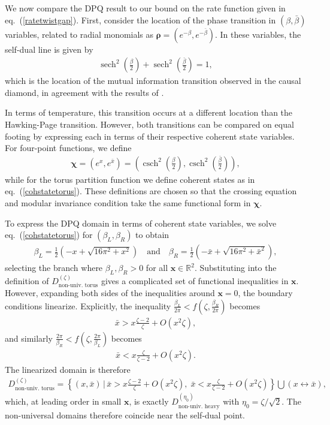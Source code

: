 \documentclass[a4paper,11pt]{article}
\theoremstyle{plain}
\theoremstyle{definition}
\theoremstyle{remark}
\newcommand{\bs}[1]{\boldsymbol{#1}}
\newcommand{\ba}{\begin{equation} \begin{aligned}}
\newcommand{\ea}{\end{aligned} \end{equation}}
\DeclareMathOperator{\sech}{sech}
\DeclareMathOperator{\csch}{csch}
\begin{document}
We now compare the DPQ result to our bound on the rate function given in eq.~(\ref{ratetwistgap}). First, consider the location of the phase transition in $(\beta,\bar{\beta})$ variables, related to radial monomials as $\bs{\rho} = (e^{-\beta}, e^{-\bar{\beta}})$. In these variables, the self-dual line is given by
\ba
\sech^2\left(\frac{\beta}{2}\right) + \sech^2\left(\frac{\bar{\beta}}{2}\right) = 1,
\ea
which is the location of the mutual information transition observed in the causal diamond, in agreement with the results of \cite{Ceyhan:2025qrj}. 

In terms of temperature, this transition occurs at a different location than the Hawking-Page transition. However, both transitions can be compared on equal footing by expressing each in terms of their respective coherent state variables. For four-point functions, we define
\ba
\bs{\chi} = (e^x,e^{\bar{x}}) = \left( \csch^2\left( \frac{\beta}{2}\right), \csch^2\left( \frac{\bar{\beta}}{2}\right)\right),
\ea
while for the torus partition function we define coherent states as in eq.~(\ref{cohstatetorus}). These definitions are chosen so that the crossing equation and modular invariance condition take the same functional form in $\bs{\chi}$.

To express the DPQ domain in terms of coherent state variables, we solve eq.~(\ref{cohstatetorus}) for $(\beta_L,\beta_R)$ to obtain
\ba
\beta_L = \frac{1}{2}\left(-x + \sqrt{16\pi^2 + x^2}\right) \quad \text{and} \quad \beta_R = \frac{1}{2}\left(-\bar{x} + \sqrt{16\pi^2 + \bar{x}^2}\right),
\ea
selecting the branch where $\beta_L, \beta_R > 0$ for all $\bs{x} \in \mathbb{R}^2$. Substituting into the definition of $D^{(\zeta)}_{\text{non-univ.~torus}}$ gives a complicated set of functional inequalities in $\bs{x}$. However, expanding both sides of the inequalities around $\bs{x} = 0$, the boundary conditions linearize. Explicitly, the inequality $\frac{\beta_L}{2\pi} < f(\zeta, \frac{\beta_R}{2\pi})$ becomes
\ba
\bar{x} > x\frac{\zeta - 2}{\zeta} + O(x^2 \zeta),
\ea
and similarly $\frac{2\pi}{\beta_R} < f(\zeta, \frac{2\pi}{\beta_L})$ becomes
\ba
\bar{x} < x\frac{\zeta}{\zeta - 2} + O(x^2 \zeta ).
\ea
The linearized domain is therefore
\ba
D^{(\zeta)}_{\text{non-univ.~torus}} = \left\{(x,\bar{x}) \,\Bigg|\, \bar{x} > x\frac{\zeta - 2}{\zeta} + O(x^{2}\zeta), \; \bar{x} < x\frac{\zeta}{\zeta - 2} + O(x^{2}\zeta)\right\} \bigcup (x \leftrightarrow \bar{x}),
\ea
which, at leading order in small $\bs{x}$, is exactly $D^{(\eta_0)}_{\text{non-univ.~heavy}}$ with $\eta_0 = \zeta/\sqrt{2}$. The non-universal domains therefore coincide near the self-dual point. 
\end{document}
